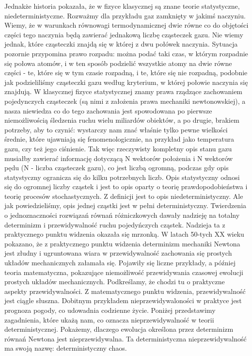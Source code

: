 \documentclass[a4paper,12pt,polish]{sphinxmanual}
\begin{document}
Jednakże historia pokazała, że  w fizyce klasycznej są znane teorie statystyczne, niedeterministyczne.  Rozważmy dla przykładu  gaz zamknięty w jakimś naczyniu. Wiemy, że w warunkach równowagi termodynamicznej dwie równe co do objętości części tego naczynia będą zawierać jednakową liczbę cząsteczek gazu. Nie wiemy jednak, które cząsteczki znajdą się w której z dwu połówek naczynia. Sytuacja pozornie przypomina prawo rozpadu: można podać taki czas, w którym rozpadnie się połowa atomów, i w ten sposób podzielić wszystkie atomy na dwie równe części - te, które się w tym czasie rozpadną, i te, które się nie rozpadną, podobnie jak podzieliliśmy cząsteczki gazu według kryterium, w której połowie naczynia się znajdują. W klasycznej fizyce statystycznej znamy prawa rządzące zachowaniem pojedynczych cząsteczek (są nimi z założenia prawa mechaniki newtonowskiej), a nasza niewiedza co do tego zachowania jest spowodowana po pierwsze niemożliwością śledzenia ruchu wielu miliardów obiektów, a po drugie, brakiem potrzeby, aby to czynić: wystarczy nam znać właśnie tylko pewne wielkości średnie, które ujawniają się fenomenologicznie, na przykład jako temperatura gazu, czy też jego ciśnienie. Tak więc rzeczywisty kompletny opis stanu gazu musiałby zawierać informację dotyczącą N wektorów położenia i N wektorów pędu (N - liczba cząsteczek gazu), co jest liczbą ogromną, podczas gdy opis statystyczny ogranicza się do kilku potrzebnych liczb. Opis statystyczny odnosi się do ogromnej liczby cząstek i jest to opis oparty o teorię prawdopodobieństwa i teorię procesów stochastycznych. Z definicji jest to opis niedeterministyczny. Ale jak powiedzieliśmy, opis jednej cząstki jest w pełni deterministyczny. Twierdzenia o jednoznaczności rozwiązań równań różniczkowych dawały nadzieję na totalny determinizm i przewidywalność ruchu pojedyńczych cząstek. Nadzieja ta z praktycznego punktu widzenia okazała się mrzonką.  W latach 50-tych XX wieku pokazano, że z praktycznego punktu widzenia determinizm mechaniki Newtona jest złudny i ugruntowana wiara w przewidywalność zachowania się prostych układów  mechanicznych  załamała się. Pojawiły się liczne przykłady, a później teoria matematyczna, pokazujące  niemożliwość przewidywania czasowej ewolucji prostych układów mechanicznych. Podkreślamy, że chodzi tu o praktyczne aspekty przewidywalności. Z matematycznego punktu widzenia, przewidywalność jest ciągle słuszna.  Dobitnym przykładem nieprzewidywaloności w praktyce jest prognoza pogody, co udowadnia codzienne życie. Poniżej przedstawimy zagadnienia, które ukażą nam, co oznacza nieprzewidywalność w teorii deterministycznej. Pokażemy, dlaczego ewolucja określona przez determinizm równań Newtona jest nieprzewidywalna. Ta deterministyczna nieprzewidywalność ma swoją nazwę: deterministyczny chaos.
\end{document}
